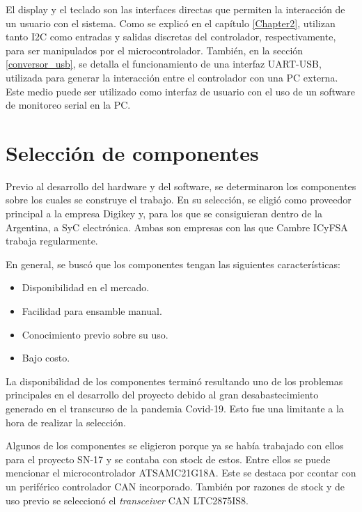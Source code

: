 El display y el teclado son las interfaces directas que permiten la interacción de un usuario con el sistema. Como se explicó en el capítulo \ref{Chapter2}, utilizan tanto I2C como entradas y salidas discretas del controlador, respectivamente, para ser manipulados por el microcontrolador. También, en la sección \ref{conversor_usb}, se detalla el funcionamiento de una interfaz UART-USB, utilizada para generar la interacción entre el controlador con una PC externa. Este medio puede ser utilizado como interfaz de usuario con el uso de un software de monitoreo serial en la PC.

\section{Selección de componentes}
\label{seccion_seleccion_componentes}

Previo al desarrollo del hardware y del software, se determinaron los componentes sobre los cuales se construye el trabajo. En su selección, se eligió como proveedor principal a la empresa Digikey\citep{web_digikey} y, para los que se consiguieran dentro de la Argentina, a SyC electrónica\citep{web_syc}. Ambas son empresas con las que Cambre ICyFSA trabaja regularmente. 

En general, se buscó que los componentes tengan las siguientes características:
\begin{itemize}
	\item Disponibilidad en el mercado.
	\item Facilidad para ensamble manual.
	\item Conocimiento previo sobre su uso.
	\item Bajo costo.
\end{itemize}

La disponibilidad de los componentes terminó resultando uno de los problemas principales en el desarrollo del proyecto debido al gran desabastecimiento generado en el transcurso de la pandemia Covid-19. Esto fue una limitante a la hora de realizar la selección.

Algunos de los componentes se eligieron porque ya se había trabajado con ellos para el proyecto SN-17 y se contaba con stock de estos. Entre ellos se puede mencionar el microcontrolador ATSAMC21G18A\citep{web_ATSAMC21G18A}. Este se destaca por ccontar con un periférico controlador CAN incorporado. También por razones de stock y de uso previo se seleccionó el \textit{transceiver} CAN LTC2875IS8\citep{web_transciever_CAN}.

